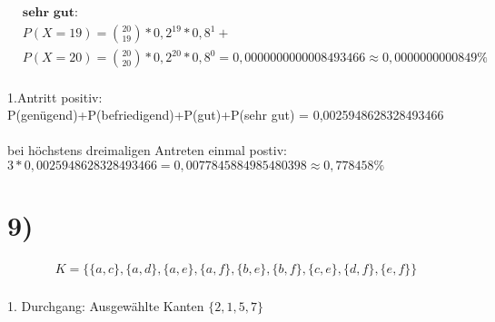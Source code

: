 \documentclass[11pt,a4paper]{article}
\begin{document}
  	\begin{align*}
  		& \textbf{sehr gut:} \\
  		& P(X=19) = \binom{20}{19} * 0,2^{19} * 0,8^{1} + \\
  		& P(X=20) = \binom{20}{20} * 0,2^{20} * 0,8^{0} = 0,0000000000008493466 \approx 0,0000000000849\%
  	\end{align*}
  	\\
  	1.Antritt positiv:\\
  	P(genügend)+P(befriedigend)+P(gut)+P(sehr gut) = 0,0025948628328493466\\
  	\\
  	bei höchstens dreimaligen Antreten einmal postiv:\\
  	\(3* 0,0025948628328493466 = 0,0077845884985480398 \approx 0,778458\% \)

		\newpage
		\section*{9)}

		\begin{align*}
			K = \{\{a, c\}, \{a, d\}, \{a, e\}, \{a, f\}, \{b, e\}, \{b, f\}, \{c, e\}, \{d, f\}, \{e, f\}\}
		\end{align*}
		\\
		1. Durchgang: Ausgewählte Kanten $\{2, 1, 5, 7\}$ \\
\end{document}
